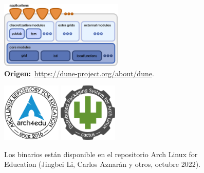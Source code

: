 \begin{frame}
	\begin{minipage}{0.45\textwidth}
		\begin{figure}[ht!]
			\centering
			\includegraphics[height=3.2cm]{dunedesign}
			\caption*{
				\textbf{Origen:}~\url{https://dune-project.org/about/dune}.
			}
		\end{figure}
	\end{minipage}\qquad\qquad
	\begin{minipage}{0.45\textwidth}
		\begin{figure}[ht!]
			\centering
			\href{https://github.com/arch4edu/arch4edu}{\includegraphics[height=2.8cm]{arch4edu}}\quad\quad
			\href{https://github.com/arch4edu/cactus}{\includegraphics[height=2.8cm]{cactus}}
			\caption{Los binarios están disponible en el repositorio
				\alert{Arch Linux for Education}
				(Jingbei Li, Carlos Aznarán y otros, octubre 2022).
			}
		\end{figure}
	\end{minipage}
\end{frame}

